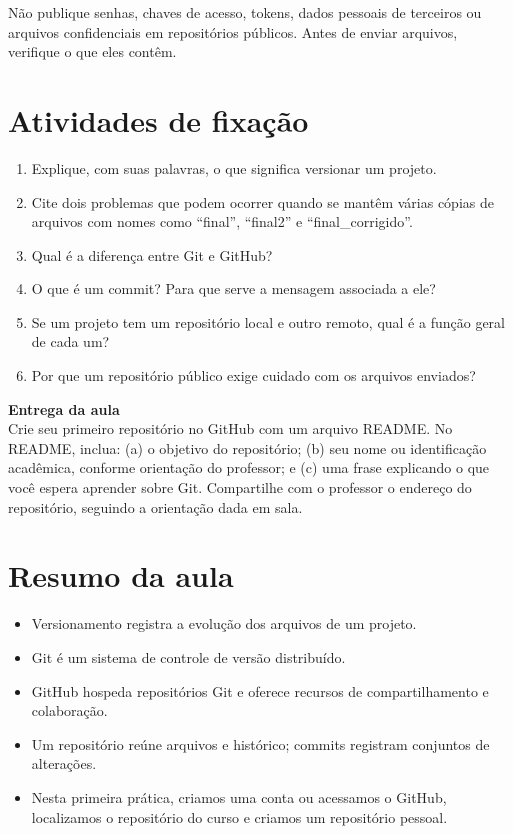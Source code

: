 \documentclass[12pt,a4paper]{article}
\begin{document}
\begin{atencao}
Não publique senhas, chaves de acesso, tokens, dados pessoais de terceiros ou arquivos confidenciais em repositórios públicos. Antes de enviar arquivos, verifique o que eles contêm.
\end{atencao}

\section{Atividades de fixação}
\begin{enumerate}
\item Explique, com suas palavras, o que significa versionar um projeto.
\item Cite dois problemas que podem ocorrer quando se mantêm várias cópias de arquivos com nomes como ``final'', ``final2'' e ``final\_corrigido''.
\item Qual é a diferença entre Git e GitHub?
\item O que é um commit? Para que serve a mensagem associada a ele?
\item Se um projeto tem um repositório local e outro remoto, qual é a função geral de cada um?
\item Por que um repositório público exige cuidado com os arquivos enviados?
\end{enumerate}

\begin{atividade}
\textbf{Entrega da aula}\\
Crie seu primeiro repositório no GitHub com um arquivo README. No README, inclua: (a) o objetivo do repositório; (b) seu nome ou identificação acadêmica, conforme orientação do professor; e (c) uma frase explicando o que você espera aprender sobre Git. Compartilhe com o professor o endereço do repositório, seguindo a orientação dada em sala.
\end{atividade}

\section{Resumo da aula}
\begin{itemize}
\item Versionamento registra a evolução dos arquivos de um projeto.
\item Git é um sistema de controle de versão distribuído.
\item GitHub hospeda repositórios Git e oferece recursos de compartilhamento e colaboração.
\item Um repositório reúne arquivos e histórico; commits registram conjuntos de alterações.
\item Nesta primeira prática, criamos uma conta ou acessamos o GitHub, localizamos o repositório do curso e criamos um repositório pessoal.
\end{itemize}
\end{document}
